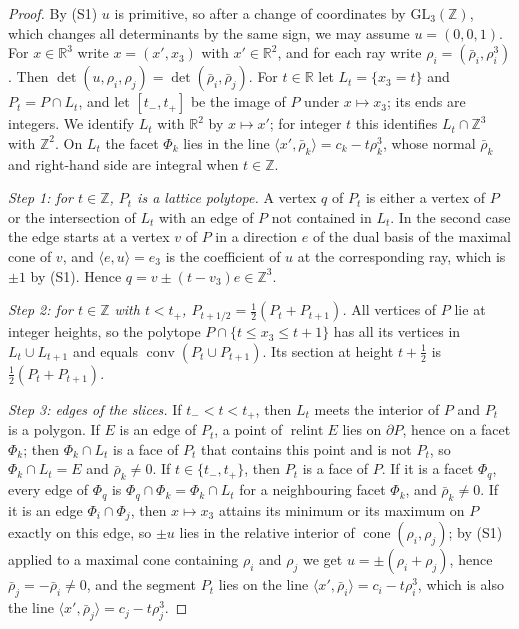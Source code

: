 \documentclass[12pt]{article}
\newcommand{\R}{\mathbb{R}}
\newcommand{\Z}{\mathbb{Z}}
\newcommand{\GL}{\mathrm{GL}}
\newcommand{\cone}{\operatorname{cone}}
\newcommand{\relint}{\operatorname{relint}}
\newcommand{\inn}[2]{\langle #1,#2\rangle}
\begin{document}
\begin{proof}
By (S1) $u$ is primitive, so after a change of coordinates by $\GL_3(\Z)$, which changes all determinants by the same sign, we may assume $u=(0,0,1)$. For $x\in\R^3$ write $x=(x',x_3)$ with $x'\in\R^2$, and for each ray write $\rho_i=(\bar\rho_i,\rho_i^3)$. Then $\det(u,\rho_i,\rho_j)=\det(\bar\rho_i,\bar\rho_j)$. For $t\in\R$ let $L_t=\{x_3=t\}$ and $P_t=P\cap L_t$, and let $[t_-,t_+]$ be the image of $P$ under $x\mapsto x_3$; its ends are integers. We identify $L_t$ with $\R^2$ by $x\mapsto x'$; for integer $t$ this identifies $L_t\cap\Z^3$ with $\Z^2$. On $L_t$ the facet $\Phi_k$ lies in the line $\inn{x'}{\bar\rho_k}=c_k-t\rho^3_k$, whose normal $\bar\rho_k$ and right-hand side are integral when $t\in\Z$.

\emph{Step 1: for $t\in\Z$, $P_t$ is a lattice polytope.} A vertex $q$ of $P_t$ is either a vertex of $P$ or the intersection of $L_t$ with an edge of $P$ not contained in $L_t$. In the second case the edge starts at a vertex $v$ of $P$ in a direction $e$ of the dual basis of the maximal cone of $v$, and $\inn{e}{u}=e_3$ is the coefficient of $u$ at the corresponding ray, which is $\pm1$ by (S1). Hence $q=v\pm(t-v_3)e\in\Z^3$.

\emph{Step 2: for $t\in\Z$ with $t<t_+$, $P_{t+1/2}=\frac12(P_t+P_{t+1})$.} All vertices of $P$ lie at integer heights, so the polytope $P\cap\{t\le x_3\le t+1\}$ has all its vertices in $L_t\cup L_{t+1}$ and equals $\operatorname{conv}(P_t\cup P_{t+1})$. Its section at height $t+\frac12$ is $\frac12(P_t+P_{t+1})$.

\emph{Step 3: edges of the slices.} If $t_-<t<t_+$, then $L_t$ meets the interior of $P$ and $P_t$ is a polygon. If $E$ is an edge of $P_t$, a point of $\relint E$ lies on $\partial P$, hence on a facet $\Phi_k$; then $\Phi_k\cap L_t$ is a face of $P_t$ that contains this point and is not $P_t$, so $\Phi_k\cap L_t=E$ and $\bar\rho_k\ne0$. If $t\in\{t_-,t_+\}$, then $P_t$ is a face of $P$. If it is a facet $\Phi_q$, every edge of $\Phi_q$ is $\Phi_q\cap\Phi_k=\Phi_k\cap L_t$ for a neighbouring facet $\Phi_k$, and $\bar\rho_k\ne0$. If it is an edge $\Phi_i\cap\Phi_j$, then $x\mapsto x_3$ attains its minimum or its maximum on $P$ exactly on this edge, so $\pm u$ lies in the relative interior of $\cone(\rho_i,\rho_j)$; by (S1) applied to a maximal cone containing $\rho_i$ and $\rho_j$ we get $u=\pm(\rho_i+\rho_j)$, hence $\bar\rho_j=-\bar\rho_i\ne0$, and the segment $P_t$ lies on the line $\inn{x'}{\bar\rho_i}=c_i-t\rho^3_i$, which is also the line $\inn{x'}{\bar\rho_j}=c_j-t\rho^3_j$.


\end{proof}
\end{document}
